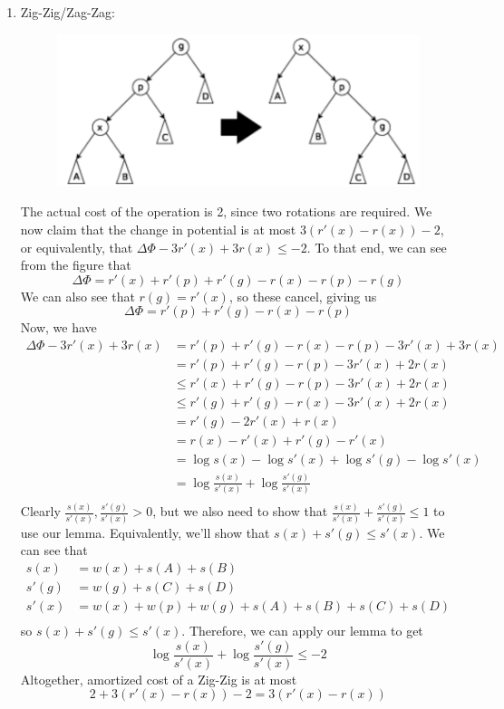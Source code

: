 \documentclass[12pt]{article}
\begin{document}
\begin{enumerate}
  \item Zig-Zig/Zag-Zag:
  \begin{figure}[!ht]
    \centering
    \includegraphics[scale=0.33]{pics/splay_zig_zig2}
  \end{figure}
  The actual cost of the operation is 2, since two rotations are required. We now claim that the change in potential is at most $3(r'(x) - r(x)) - 2$, or equivalently, that $\Delta\Phi -3r'(x) + 3r(x) \leq -2$. To that end, we can see from the figure that
  \[ \Delta\Phi = r'(x) + r'(p)+ r'(g) - r(x) - r(p) - r(g) \]
  We can also see that $r(g) = r'(x)$, so these cancel, giving us
  \[ \Delta\Phi = r'(p)+ r'(g) - r(x) - r(p) \]
  Now, we have
  \begin{align*}
    \Delta\Phi -3r'(x) + 3r(x) &= r'(p) + r'(g) - r(x) - r(p) -3r'(x) + 3r(x) \\
    &= r'(p) + r'(g) - r(p) - 3r'(x) + 2r(x)\\
    &\leq r'(x) + r'(g) - r(p) - 3r'(x) + 2r(x)\\
    &\leq r'(g) + r'(g) - r(x) - 3r'(x) + 2r(x)\\
    &= r'(g) - 2r'(x) + r(x)\\
    &= r(x) - r'(x) + r'(g) - r'(x)\\
    &= \log s(x) - \log s'(x) + \log s'(g) - \log s'(x)\\
    &= \log \frac{s(x)}{s'(x)} + \log \frac{s'(g)}{s'(x)} \\
  \end{align*}
  Clearly $\frac{s(x)}{s'(x)}, \frac{s'(g)}{s'(x)} > 0$, but we also need to show that $\frac{s(x)}{s'(x)} + \frac{s'(g)}{s'(x)} \leq 1$ to use our lemma. Equivalently, we'll show that $s(x) + s'(g) \leq s'(x)$. We can see that
  \begin{align*}
    s(x) &= w(x) + s(A) + s(B) \\
    s'(g) &= w(g) + s(C) + s(D) \\
    s'(x) &= w(x) + w(p) + w(g) + s(A) + s(B) + s(C) + s(D) \\
  \end{align*}
  so $s(x) + s'(g) \leq s'(x)$. Therefore, we can apply our lemma to get
  \[ \log \frac{s(x)}{s'(x)} + \log \frac{s'(g)}{s'(x)} \leq -2 \]
  Altogether, amortized cost of a Zig-Zig is at most
  \[ 2 + 3(r'(x) - r(x)) - 2 = 3(r'(x) - r(x)) \]


\end{enumerate}
\end{document}
